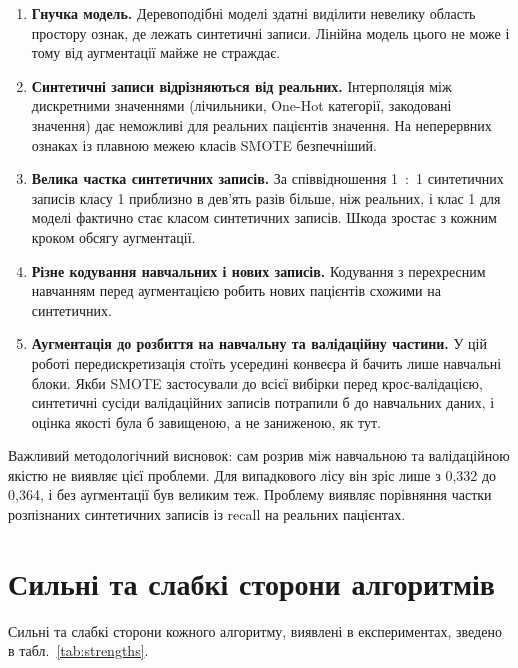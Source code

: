 \documentclass[14pt,a4paper]{extreport}
\begin{document}
\begin{enumerate}
\item \textbf{Гнучка модель.} Деревоподібні моделі здатні виділити невелику область простору ознак, де лежать синтетичні записи. Лінійна модель цього не може і тому від аугментації майже не страждає.
\item \textbf{Синтетичні записи відрізняються від реальних.} Інтерполяція між дискретними значеннями (лічильники, One-Hot категорії, закодовані значення) дає неможливі для реальних пацієнтів значення. На неперервних ознаках із плавною межею класів SMOTE безпечніший.
\item \textbf{Велика частка синтетичних записів.} За співвідношення 1~:~1 синтетичних записів класу 1 приблизно в дев'ять разів більше, ніж реальних, і клас 1 для моделі фактично стає класом синтетичних записів. Шкода зростає з кожним кроком обсягу аугментації.
\item \textbf{Різне кодування навчальних і нових записів.} Кодування з перехресним навчанням перед аугментацією робить нових пацієнтів схожими на синтетичних.
\item \textbf{Аугментація до розбиття на навчальну та валідаційну частини.} У цій роботі передискретизація стоїть усередині конвеєра й бачить лише навчальні блоки. Якби SMOTE застосували до всієї вибірки перед крос-валідацією, синтетичні сусіди валідаційних записів потрапили б до навчальних даних, і оцінка якості була б завищеною, а не заниженою, як тут.
\end{enumerate}

Важливий методологічний висновок: сам розрив між навчальною та валідаційною якістю не виявляє цієї проблеми. Для випадкового лісу він зріс лише з 0,332 до 0,364, і без аугментації був великим теж. Проблему виявляє порівняння частки розпізнаних синтетичних записів із recall на реальних пацієнтах.

\section{Сильні та слабкі сторони алгоритмів}
\label{sec:strengths}

Сильні та слабкі сторони кожного алгоритму, виявлені в експериментах, зведено в табл.~\ref{tab:strengths}.
\end{document}
